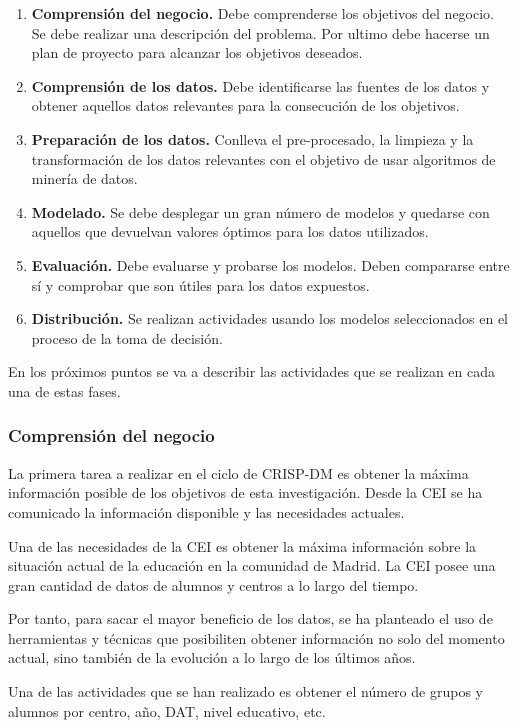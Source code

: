 \begin{enumerate}
	\item \textbf{Comprensión del negocio.} Debe comprenderse los objetivos del negocio. Se debe realizar una descripción del problema. Por ultimo debe hacerse un plan de proyecto para alcanzar los objetivos deseados.
	\item \textbf{Comprensión de los datos.} Debe identificarse las fuentes de los datos y obtener aquellos datos relevantes para la consecución de los objetivos.
	\item \textbf{Preparación de los datos.} Conlleva el pre-procesado, la limpieza y la transformación de los datos relevantes con el objetivo de usar algoritmos de minería de datos.
	\item \textbf{Modelado.} Se debe desplegar un gran número de modelos y quedarse con aquellos que devuelvan valores óptimos para los datos utilizados.
	\item \textbf{Evaluación.} Debe evaluarse y probarse los modelos. Deben compararse entre sí y comprobar que son útiles para los datos expuestos.
	\item \textbf{Distribución.} Se realizan actividades usando los modelos seleccionados en el proceso de la toma de decisión.
\end{enumerate}

En los próximos puntos se va a describir las actividades que se realizan en cada una de estas fases.

\subsubsection{Comprensión del negocio}
La primera tarea a realizar en el ciclo de CRISP-DM es obtener la máxima información posible de los objetivos de esta investigación. Desde la CEI se ha comunicado la información disponible y las necesidades actuales.

Una de las necesidades de la CEI es obtener la máxima información sobre la situación actual de la educación en la comunidad de Madrid. La CEI posee una gran cantidad de datos de alumnos y centros a lo largo del tiempo. 

Por tanto, para sacar el mayor beneficio de los datos, se ha planteado el uso de herramientas y técnicas que posibiliten obtener información no solo del momento actual, sino también de la evolución a lo largo de los últimos años.

Una de las actividades que se han realizado es obtener el número de grupos y alumnos por centro, año, DAT, nivel educativo, etc.

